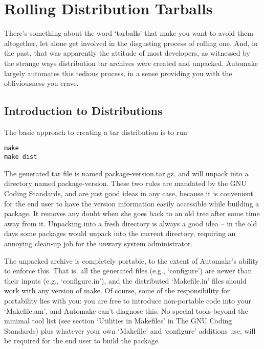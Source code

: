 \chapter{Rolling Distribution Tarballs}\label{C_Rolling_Distribution_Tarballs}
There's something about the word `tarballs' that make you want to avoid them altogether, let alone get involved in the disgusting process of rolling one. And, in the past, that was apparently the attitude of most developers, as witnessed by the strange ways distribution tar archives were created and unpacked. Automake largely automates this tedious process, in a sense providing you with the obliviousness you crave.

\section{Introduction to Distributions}

The basic approach to creating a tar distribution is to run
 	
\begin{Verbatim}[frame=single]
make
make dist
\end{Verbatim}

The generated tar file is named package-version.tar.gz, and will unpack into a directory named package-version. These two rules are mandated by the GNU Coding Standards, and are just good ideas in any case, because it is convenient for the end user to have the version information easily accessible while building a package. It removes any doubt when she goes back to an old tree after some time away from it. Unpacking into a fresh directory is always a good idea -- in the old days some packages would unpack into the current directory, requiring an annoying clean-up job for the unwary system administrator.

The unpacked archive is completely portable, to the extent of Automake's ability to enforce this. That is, all the generated files (e.g., `configure') are newer than their inputs (e.g., `configure.in'), and the distributed `Makefile.in' files should work with any version of make. Of course, some of the responsibility for portability lies with you: you are free to introduce non-portable code into your `Makefile.am', and Automake can't diagnose this. No special tools beyond the minimal tool list (see section `Utilities in Makefiles' in The GNU Coding Standards) plus whatever your own `Makefile' and `configure' additions use, will be required for the end user to build the package.


